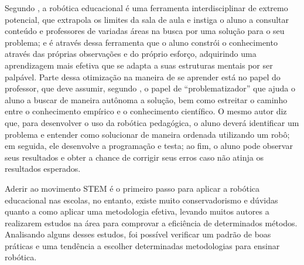 Segundo \cite{maisonnette}, a robótica educacional é uma ferramenta interdisciplinar de extremo potencial, que extrapola os limites da sala de aula e instiga o aluno a consultar conteúdo e professores de variadas áreas na busca por uma solução para o seu problema; e é através dessa ferramenta que o aluno constrói o conhecimento através das próprias observações e do próprio esforço, adquirindo uma aprendizagem mais efetiva que se adapta a suas estruturas mentais por ser palpável. Parte dessa otimização na maneira de se aprender está no papel do professor, que deve assumir, segundo \cite{nascimento}, o papel de “problematizador” que ajuda o aluno a buscar de maneira autônoma a solução, bem como estreitar o caminho entre o conhecimento empírico e o conhecimento científico. O mesmo autor diz que, para desenvolver o uso da robótica pedagógica, o aluno deverá identificar um problema e entender como solucionar de maneira ordenada utilizando um robô; em seguida, ele desenvolve a programação e testa; ao fim, o aluno pode observar seus resultados e obter a chance de corrigir seus erros caso não atinja os resultados esperados. 

Aderir ao movimento STEM é o primeiro passo para aplicar a robótica educacional nas escolas, no entanto, existe muito conservadorismo e dúvidas quanto a como aplicar uma metodologia efetiva, levando muitos autores a realizarem estudos na área para comprovar a eficiência de determinados métodos. Analisando alguns desses estudos, foi possível verificar um padrão de boas práticas e uma tendência a escolher determinadas metodologias para ensinar robótica.

